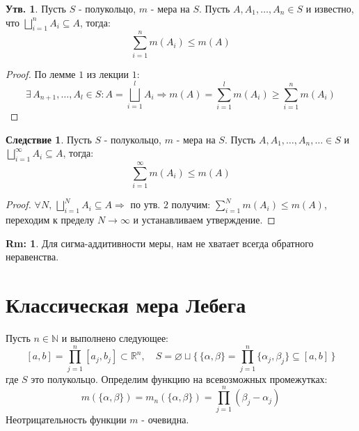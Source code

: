 \documentclass[12pt]{article}
\theoremstyle{definition}
\newtheorem{rem}{Rm:}
\newtheorem{prop}{Утв.}
\newtheorem{corollary}{Следствие}
\begin{document}
\begin{prop}
	Пусть $S$ - полукольцо, $m$ - мера на $S$. Пусть $A, A_1, \dotsc, A_n \in S$ и известно, что $\bigsqcup\limits_{i=1}^{n}A_i \subseteq A$, тогда:
	$$
		\sum\limits_{i=1}^{n}m(A_i) \leq m(A)
	$$
\end{prop}	

\begin{proof}
	По лемме $1$ из лекции $1$: 
	$$
		\exists \, A_{n+1}, \dotsc, A_l \in S \colon A = \bigsqcup\limits_{i=1}^{l}A_i \Rightarrow m(A) = \sum\limits_{i=1}^{l}m(A_i) \geq \sum\limits_{i=1}^{n} m(A_i)
	$$
\end{proof}

\begin{corollary}
	Пусть $S$ - полукольцо, $m$ - мера на $S$. Пусть $A, A_1, \dotsc, A_n, \dotsc \in S$ и $\bigsqcup\limits_{i=1}^{\infty}A_i \subseteq A$, тогда:
	$$
		\sum\limits_{i=1}^{\infty}m(A_i) \leq m(A)
	$$
\end{corollary}

\begin{proof}
	$\forall N, \, \bigsqcup\limits_{i=1}^N A_i \subseteq A \Rightarrow$ по утв. $2$ получим: $\sum\limits_{i=1}^N m(A_i) \leq m(A)$, переходим к пределу $N \to \infty$ и устанавливаем утверждение.
\end{proof}
\begin{rem}
	Для сигма-аддитивности меры, нам не хватает всегда обратного неравенства.
\end{rem}

\newpage

\section*{Классическая мера Лебега}
Пусть $n \in \mathbb{N}$ и выполнено следующее:
$$
	[a,b] = \prod\limits_{j=1}^{n}[a_j,b_j] \subset \mathbb{R}^n, \quad S = \varnothing \sqcup \{\, \{\alpha,\beta\} = \prod\limits_{j=1}^{n}\{\alpha_j,\beta_j\} \subseteq [a,b] \,\}
$$
где $S$ это полукольцо. Определим функцию на всевозможных промежутках: 
$$
	m(\{\alpha,\beta\}) = m_n(\{\alpha,\beta\}) =  \prod\limits_{j=1}^n(\beta_j - \alpha_j)
$$ 
Неотрицательность функции $m$ - очевидна.
\end{document}
